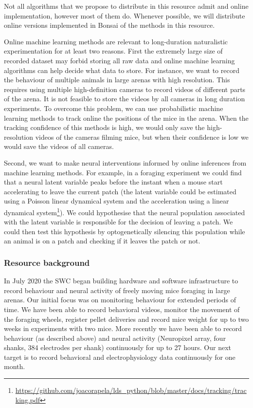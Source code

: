 Not all algorithms that we propose to distribute in this resource admit and
online implementation, however most of them do. Whenever possible, we will
distribute online versions implemented in Bonsai of the methods in this
resource.

Online machine learning methods are relevant to long-duration naturalistic
experimentation for at least two reasons. First the extremely large size of
recorded dataset may forbid storing all raw data and online machine learning
algorithms can help decide what data to store. For instance, we want to record
the behaviour of multiple animals in large arenas with high resolution. This
requires using multiple high-definition cameras to record videos of different
parts of the arena. It is not feasible to store the videos by all cameras in
long duration experiments. To overcome this problem, we can use probabilistic
machine learning methods to track online the positions of the mice in the
arena. When the tracking confidence of this methods is high, we would only save
the high-resolution videos of the cameras filming mice, but when their
confidence is low we would save the videos of all cameras.

Second, we want to make neural interventions informed by online inferences from
machine learning methods. For example, in a foraging experiment we could find
that a neural latent variable peaks before the instant when a mouse start
accelerating to leave the current patch (the latent variable could be estimated
using a Poisson linear dynamical system and the acceleration using a linear
dynamical
system\footnote{\url{https://github.com/joacorapela/lds_python/blob/master/docs/tracking/tracking.pdf}}).
We could hypothesise that the neural population associated with the latent
variable is responsible for the decision of leaving a patch. We could then test
this hypothesis by optogenetically silencing this population while an animal is
on a patch and checking if it leaves the patch or not.

\subsubsection*{Resource background}

In July 2020 the SWC began building hardware and software infrastructure to
record behaviour and neural activity of freely moving mice foraging in large
arenas. Our initial focus was on monitoring behaviour for extended periods of
time. We have been able to record behavioral videos, monitor the movement of
the foraging wheels, register pellet deliveries and record mice weight for up
to two weeks in experiments with two mice.
%
More recently we have been able to record behaviour (as described above) and
neural activity (Neuropixel array, four shanks, 384 electrodes per shank)
continuously for up to 27 hours.
%
Our next target is to record behavioral and electrophysiology data continuously
for one month.

